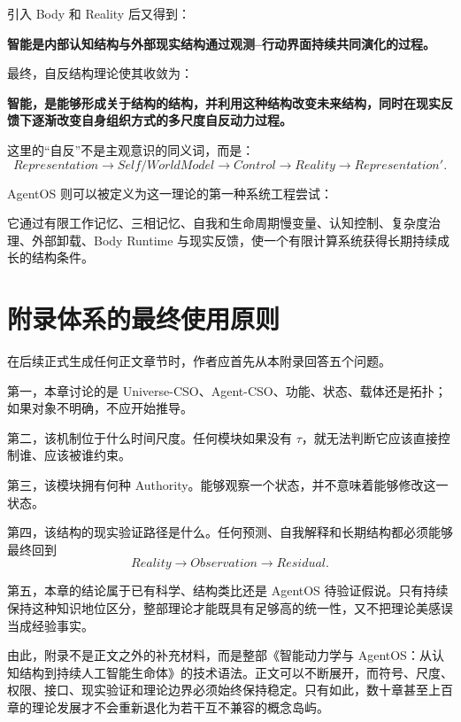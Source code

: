 引入 Body 和 Reality 后又得到：
\begin{statementbox}
\bfseries
智能是内部认知结构与外部现实结构通过观测--行动界面持续共同演化的过程。
\end{statementbox}

最终，自反结构理论使其收敛为：
\begin{statementbox}
\bfseries
智能，是能够形成关于结构的结构，并利用这种结构改变未来结构，同时在现实反馈下逐渐改变自身组织方式的多尺度自反动力过程。
\end{statementbox}

这里的“自反”不是主观意识的同义词，而是：
\[
Representation
\rightarrow
Self/WorldModel
\rightarrow
Control
\rightarrow
Reality
\rightarrow
Representation'.
\]

AgentOS 则可以被定义为这一理论的第一种系统工程尝试：
\begin{statementbox}
\centering
{}
\end{statementbox}
它通过有限工作记忆、三相记忆、自我和生命周期慢变量、认知控制、复杂度治理、外部卸载、Body Runtime 与现实反馈，使一个有限计算系统获得长期持续成长的结构条件。

\section{附录体系的最终使用原则}

在后续正式生成任何正文章节时，作者应首先从本附录回答五个问题。

第一，本章讨论的是 Universe-CSO、Agent-CSO、功能、状态、载体还是拓扑；如果对象不明确，不应开始推导。

第二，该机制位于什么时间尺度。任何模块如果没有 $\tau$，就无法判断它应该直接控制谁、应该被谁约束。

第三，该模块拥有何种 Authority。能够观察一个状态，并不意味着能够修改这一状态。

第四，该结构的现实验证路径是什么。任何预测、自我解释和长期结构都必须能够最终回到
\[
Reality
\rightarrow
Observation
\rightarrow
Residual.
\]

第五，本章的结论属于已有科学、结构类比还是 AgentOS 待验证假说。只有持续保持这种知识地位区分，整部理论才能既具有足够高的统一性，又不把理论美感误当成经验事实。

由此，附录不是正文之外的补充材料，而是整部《智能动力学与 AgentOS：从认知结构到持续人工智能生命体》的技术语法。正文可以不断展开，而符号、尺度、权限、接口、现实验证和理论边界必须始终保持稳定。只有如此，数十章甚至上百章的理论发展才不会重新退化为若干互不兼容的概念岛屿。
